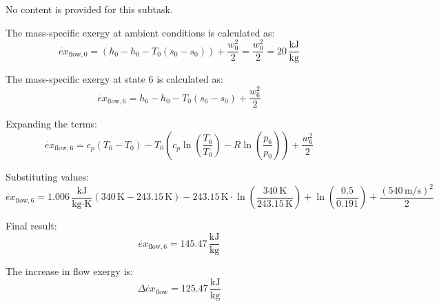 No content is provided for this subtask.

The mass-specific exergy at ambient conditions is calculated as:  
\[
\dot{ex}_{\text{flow},0} = (h_0 - h_0 - T_0(s_0 - s_0)) + \frac{w_0^2}{2} = \frac{w_0^2}{2} = 20 \, \frac{\text{kJ}}{\text{kg}}
\]

The mass-specific exergy at state 6 is calculated as:  
\[
\dot{ex}_{\text{flow},6} = h_6 - h_0 - T_0(s_6 - s_0) + \frac{w_6^2}{2}
\]

Expanding the terms:  
\[
\dot{ex}_{\text{flow},6} = c_p(T_6 - T_0) - T_0 \left( c_p \ln \left( \frac{T_6}{T_0} \right) - R \ln \left( \frac{p_6}{p_0} \right) \right) + \frac{w_6^2}{2}
\]

Substituting values:  
\[
\dot{ex}_{\text{flow},6} = 1.006 \, \frac{\text{kJ}}{\text{kg·K}} \left( 340 \, \text{K} - 243.15 \, \text{K} \right) - 243.15 \, \text{K} \cdot \ln \left( \frac{340 \, \text{K}}{243.15 \, \text{K}} \right) + \ln \left( \frac{0.5}{0.191} \right) + \frac{(540 \, \text{m/s})^2}{2}
\]

Final result:  
\[
\dot{ex}_{\text{flow},6} = 145.47 \, \frac{\text{kJ}}{\text{kg}}
\]

The increase in flow exergy is:  
\[
\Delta \dot{ex}_{\text{flow}} = 125.47 \, \frac{\text{kJ}}{\text{kg}}
\]